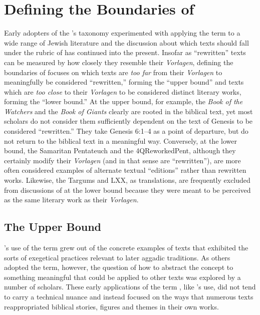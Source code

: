 
\section{Defining the Boundaries of \RWB}

Early adopters of the \vermes's taxonomy experimented with applying the term \rwb to a wide range of \secondtemple Jewish literature and the discussion about which texts should fall under the rubric of \rwb has continued into the present. Insofar as ``rewritten'' texts can be measured by how closely they resemble their \emph{Vorlagen}, defining the boundaries of \rwb focuses on which texts are \emph{too far} from their \emph{Vorlagen} to meaningfully be considered ``rewritten,'' forming the ``upper bound'' and texts which are \emph{too close} to their \emph{Vorlagen} to be considered distinct literary works, forming the ``lower bound.'' At the upper bound, for example, the \emph{Book of the Watchers} and the \emph{Book of Giants} clearly are rooted in the biblical text, yet most scholars do not consider them sufficiently dependent on the text of Genesis to be considered ``rewritten.'' They take Genesis 6:1--4 as a point of departure, but do not return to the biblical text in a meaningful way. Conversely, at the lower bound, the Samaritan Pentateuch and the 4QReworkedPent, although they certainly modify their \emph{Vorlagen} (and in that sense are ``rewritten''), are more often considered examples of alternate textual ``editions'' rather than rewritten works. Likewise, the Targums and LXX, as translations, are frequently excluded from discussions of \rwb at the lower bound because they were meant to be perceived as the same literary work as their \emph{Vorlagen}. 

\subsection{The Upper Bound}

\vermes's use of the term \rwb grew out of the concrete examples of texts that exhibited the sorts of exegetical practices relevant to later aggadic traditions. As others adopted the term, however, the question of how to abstract the concept to something meaningful that could be applied to other texts was explored by a number of scholars. These early applications of the term \rwb, like \vermes's use, did not tend to carry a technical nuance and instead focused on the ways that numerous texts reappropriated biblical stories, figures and themes in their own works. 

